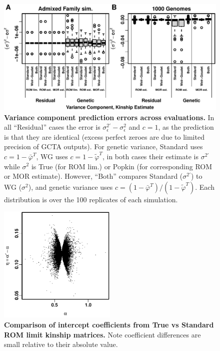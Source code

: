\documentclass[11pt]{article}
\begin{document}
\begin{figure}[bp!]
  \centering
  \includegraphics[width=\textwidth]{preds-reml-errors.pdf}
  \caption{
    {\bf Variance component prediction errors across evaluations.}
    In all ``Residual'' cases the error is $\sigma^{2\prime}_\epsilon - \sigma^2_\epsilon$ and $c = 1$, as the prediction is that they are identical (excess perfect zeroes are due to limited precision of GCTA outputs).
    For genetic variance, Standard uses $c = 1 - \bar{\varphi}^T$, WG uses $c = 1 - \tilde{\varphi}^T$, in both cases their estimate is $\sigma^{2\prime}$ while $\sigma^2$ is True (for ROM lim.) or Popkin (for corresponding ROM or MOR estimate).
    However, ``Both'' compares Standard ($\sigma^{2\prime}$) to WG ($\sigma^2$), and genetic variance uses $c = \left( 1 - \bar{\varphi}^T \right) / \left( 1 - \tilde{\varphi}^T \right)$.
    Each distribution is over the 100 replicates of each simulation.
  }
  \label{fig:preds-reml-errors}
\end{figure}

\begin{figure}[bp!]
  \centering
  \includegraphics[width=0.5\textwidth]{sim-admix-n1000-m100000-k3-f0.3-s0.5-mc100-h0.8-g20-fes/lmm-intercept-test.pdf}
  \caption{
    {\bf Comparison of intercept coefficients from True vs Standard ROM limit kinship matrices.}
    Note coefficient differences are small relative to their absolute value.
  }
  \label{fig:lmm-intercept-test}
\end{figure}
\end{document}
